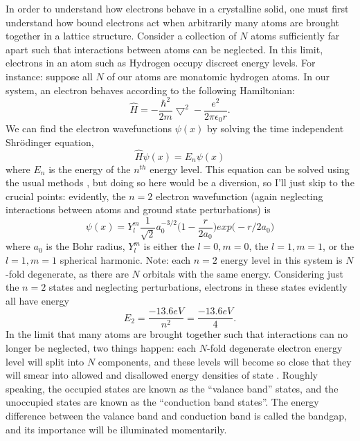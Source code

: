 \indent In order to understand how electrons behave in a crystalline solid, one must first understand how bound electrons act when arbitrarily many atoms are brought together in a lattice structure. Consider a collection of $N$ atoms sufficiently far apart such that interactions between atoms can be neglected. In this limit, electrons in an atom such as Hydrogen occupy discreet energy levels. For instance: suppose all $N$ of our atoms are monatomic hydrogen atoms. In our system, an electron behaves according to the following Hamiltonian:
\begin{equation}
\hat{H} = -\frac{\hbar^2}{2m} \bigtriangledown^2 - \frac{e^2}{2\pi \epsilon_0 r}.
\end{equation}
We can find the electron wavefunctions $\psi(x)$ by solving the time independent Shr\"{o}dinger equation,
\begin{equation}
\hat{H}\psi(x) = E_n\psi(x)
\end{equation}
where $E_n$ is the energy of the $n^{th}$ energy level. This equation can be solved using the usual methods \cite{griffiths}, but doing so here would be a diversion, so I'll just skip to the crucial points: evidently, the $n=2$ electron wavefunction (again neglecting interactions between atoms and ground state perturbations) is
\begin{equation}
\psi(x) = Y^m_l\frac{1}{\sqrt{2}}a^{-3/2}_0\Big(1-\frac{r}{2a_0}\Big ) exp\big(-r/2a_0 \big)
\end{equation}
where $a_0$ is the Bohr radius, $Y^m_l$ is either the $l=0, m=0$, the $l=1, m=1$, or the $l=1, m=1$ spherical harmonic. Note: each $n = 2$ energy level in this system is $N$-fold degenerate, as there are $N$ orbitals with the same energy. Considering just the $n = 2$ states and neglecting perturbations, electrons in these states evidently all have energy
\begin{equation}
E_2 = \frac{-13.6eV}{n^2} = \frac{-13.6eV}{4}.
\end{equation}
In the limit that many atoms are brought together such that interactions can no longer be neglected, two things happen: each $N$-fold degenerate electron energy level will split into $N$ components, and these levels will become so close that they will smear into allowed and disallowed energy densities of state \cite{iadonisi, sirdesh, griffiths, davies, fox}. Roughly speaking, the occupied states are known as the ``valance band'' states, and the unoccupied states are known as the ``conduction band states''. The energy difference between the valance band and conduction band is called the bandgap, and its importance will be illuminated momentarily. 

